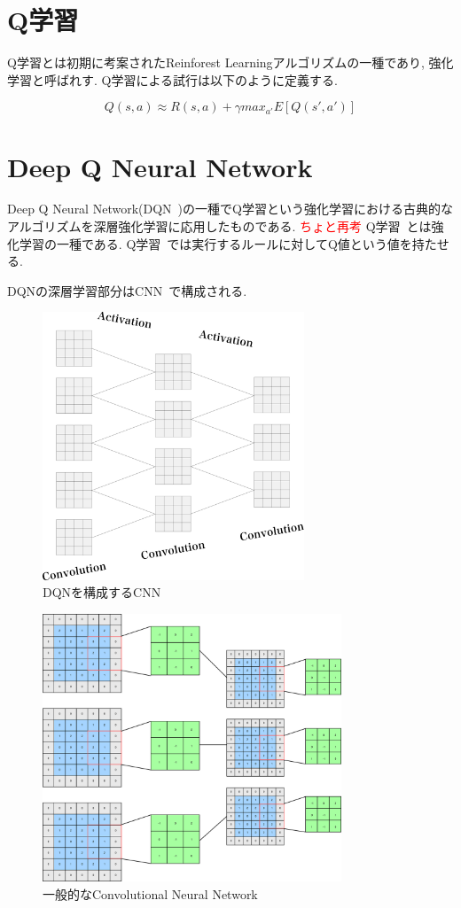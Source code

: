 \section{Q学習}

Q学習とは初期に考案されたReinforest Learningアルゴリズムの一種であり, 強化学習と呼ばれす.
Q学習による試行は以下のように定義する.

\begin{equation}
    Q(s, a) \approx R(s, a) + \gamma max_{a'} E[Q(s', a')]
\end{equation}

\section{Deep Q Neural Network}

Deep Q Neural Network(DQN~\cite{DQN})の一種でQ学習という強化学習における古典的なアルゴリズムを深層強化学習に応用したものである.
\textcolor{red}{ちょと再考}
Q学習~\cite{QL}とは強化学習の一種である. Q学習~\cite{QL}では実行するルールに対してQ値という値を持たせる.

DQNの深層学習部分はCNN~\cite{DQN}で構成される.

\begin{figure}[H]
    \centering
    \includegraphics[clip,height = 8.0cm]{assets/dqn_convolution.eps}
    \caption{DQNを構成するCNN}  \label{sample}
\end{figure}




\begin{figure}[H]
    \centering
    \includegraphics[clip,height = 8.0cm]{assets/CNN_typical.eps}
    \caption{一般的なConvolutional Neural Network}  \label{sample}
\end{figure}



